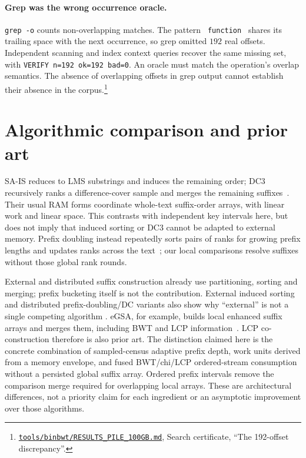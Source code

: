 \documentclass[10pt]{article}
\newcommand{\qnum}[2]{#2}
\newcommand{\ev}[2]{\footnote{\href{https://github.com/pangenome/sxgc/blob/c46a85217b9b269c91179cbebc396f96453181af/#1}{\nolinkurl{#1}}, #2.}}
\begin{document}
\paragraph{Grep was the wrong occurrence oracle.}
\texttt{grep -o} counts non-overlapping matches. The pattern \verb| function | shares its trailing space with the next occurrence, so grep omitted $\qnum{missed}{192}$ real offsets. Independent scanning and index context queries recover the same missing set, with \texttt{VERIFY n=\qnum{missed}{192} ok=\qnum{missed}{192} bad=\qnum{bad}{0}}. An oracle must match the operation's overlap semantics. The absence of overlapping offsets in grep output cannot establish their absence in the corpus.\ev{tools/binbwt/RESULTS_PILE_100GB.md}{Search certificate, ``The 192-offset discrepancy''}

\section{Algorithmic comparison and prior art}
SA-IS reduces to LMS substrings and induces the remaining order; DC3 recursively ranks a
difference-cover sample and merges the remaining suffixes~\cite{sais,dc3}. Their usual RAM
forms coordinate whole-text suffix-order arrays, with linear work and linear space. This
contrasts with independent key intervals here, but does not imply that induced sorting or DC3
cannot be adapted to external memory. Prefix doubling instead repeatedly sorts pairs of
ranks for growing prefix lengths and updates ranks across the text~\cite{sa}; our local
comparisons resolve suffixes without those global rank rounds.

External and distributed suffix construction already use partitioning, sorting and merging;
prefix bucketing itself is not the contribution. External induced sorting and distributed
prefix-doubling/DC variants also show why ``external'' is not a single competing algorithm
\cite{bingmann}. eGSA, for example, builds local enhanced suffix arrays and merges them,
including BWT and LCP information~\cite{egsa}. LCP co-construction therefore is also prior art.
The distinction claimed here is the concrete combination of sampled-census adaptive prefix
depth, work units derived from a memory envelope, and fused BWT/chi/LCP ordered-stream
consumption without a persisted global suffix array. Ordered prefix intervals remove the
comparison merge required for overlapping local arrays. These are architectural differences,
not a priority claim for each ingredient or an asymptotic improvement over those algorithms.
\end{document}
